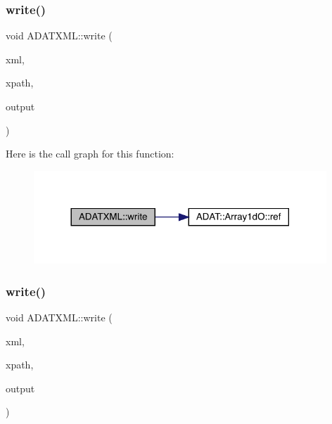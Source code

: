 \subsubsection{\texorpdfstring{write()}{write()}\hspace{0.1cm}{\footnotesize\ttfamily [55/58]}}
{\footnotesize\ttfamily void A\+D\+A\+T\+X\+M\+L\+::write (\begin{DoxyParamCaption}\item[{\mbox{\hyperlink{classADATXML_1_1XMLWriter}{X\+M\+L\+Writer}} \&}]{xml,  }\item[{const std\+::string \&}]{xpath,  }\item[{const \mbox{\hyperlink{classADAT_1_1Array1dO}{Array1dO}}$<$ unsigned long int $>$ \&}]{output }\end{DoxyParamCaption})}

Here is the call graph for this function\+:\nopagebreak
\begin{figure}[H]
\begin{center}
\leavevmode
\includegraphics[width=312pt]{d2/da3/group__io_ga930bf7dd8f7a313ec5f29eacc08d06ba_cgraph}
\end{center}
\end{figure}
\mbox{\label{group__io_ga83e5a11ea845805029325ff1c7946f36}} 
\subsubsection{\texorpdfstring{write()}{write()}\hspace{0.1cm}{\footnotesize\ttfamily [56/58]}}
{\footnotesize\ttfamily void A\+D\+A\+T\+X\+M\+L\+::write (\begin{DoxyParamCaption}\item[{\mbox{\hyperlink{classADATXML_1_1XMLWriter}{X\+M\+L\+Writer}} \&}]{xml,  }\item[{const std\+::string \&}]{xpath,  }\item[{const \mbox{\hyperlink{classADAT_1_1Array1dO}{Array1dO}}$<$ float $>$ \&}]{output }\end{DoxyParamCaption})}

